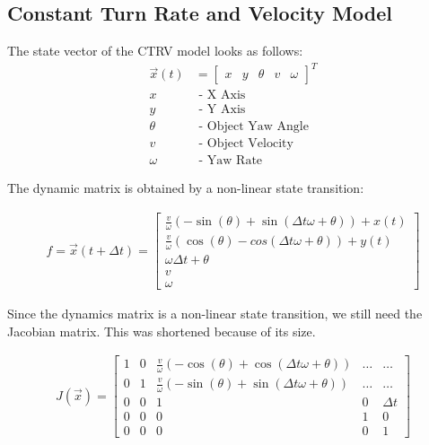 \documentclass[11pt,oneside,openright]{mpreport}
\begin{document}
\subsection{Constant Turn Rate and Velocity Model}
The state vector \cite{Schubert2008} of the CTRV model looks as follows:
\begin{align*}
\vec{x}(t) &=
\begin{bmatrix}
x & y & \theta & v & \omega
\end{bmatrix}^T\\
x &\text{ - X Axis}\\
y &\text{ - Y Axis}\\
\theta &\text{ - Object Yaw Angle}\\
v &\text{ - Object Velocity}\\
\omega &\text{ - Yaw Rate}
\end{align*}

The dynamic matrix is obtained by a non-linear state transition:

\begin{align*}
f = \vec{x}(t + \Delta t)=
\begin{bmatrix}
\frac{v}{\omega} (-\sin(\theta) + \sin(\Delta t \omega + \theta)) + x(t) \\
\frac{v}{\omega} (\cos(\theta) - cos(\Delta t \omega + \theta)) + y(t) \\
\omega \Delta t + \theta\\
v\\
\omega
\end{bmatrix} 
\end{align*}

Since the dynamics matrix is a non-linear state transition, we still need the Jacobian matrix. This was shortened because of its size.
 
 
\begin{align*}
J(\vec{x})=
\begin{bmatrix}
1 & 0 & \frac{v}{\omega} (-\cos(\theta) + \cos(\Delta t \omega + \theta))& \dots & \dots \\
0 & 1 & \frac{v}{\omega} (-\sin(\theta) + \sin(\Delta t \omega + \theta))& \dots & \dots \\
0 & 0 & 1 & 0 & \Delta t\\
0 & 0 & 0 & 1 & 0\\
0 & 0 & 0 & 0 & 1
\end{bmatrix} 
\end{align*}
\end{document}
